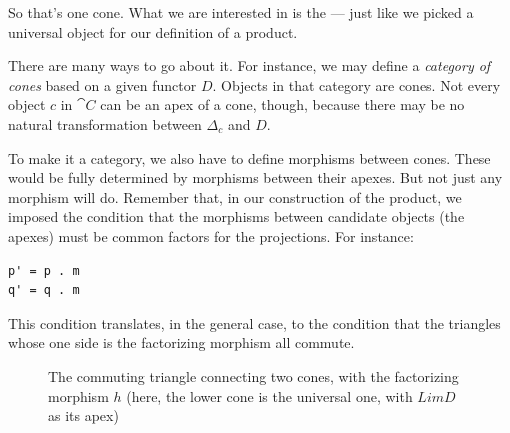 \noindent
So that's one cone. What we are interested in is the  --- just like we picked a universal object for our definition of a
product.

There are many ways to go about it. For instance, we may define a
\emph{category of cones} based on a given functor $D$. Objects in that
category are cones. Not every object $c$ in $\cat{C}$ can be an
apex of a cone, though, because there may be no natural transformation
between $\Delta_c$ and $D$.

To make it a category, we also have to define morphisms between cones.
These would be fully determined by morphisms between their apexes. But
not just any morphism will do. Remember that, in our construction of the
product, we imposed the condition that the morphisms between candidate
objects (the apexes) must be common factors for the projections. For
instance:

\begin{Verbatim}
p' = p . m
q' = q . m
\end{Verbatim}

\begin{figure}[H]
    \centering
\end{figure}

This condition translates, in the general case, to the condition that
the triangles whose one side is the factorizing morphism all commute.

\begin{figure}[H]
\centering
{}
\caption{The commuting triangle connecting two cones, with the factorizing
morphism $h$ (here, the lower cone is the universal one, with
$Lim D$ as its apex)}
\end{figure}

